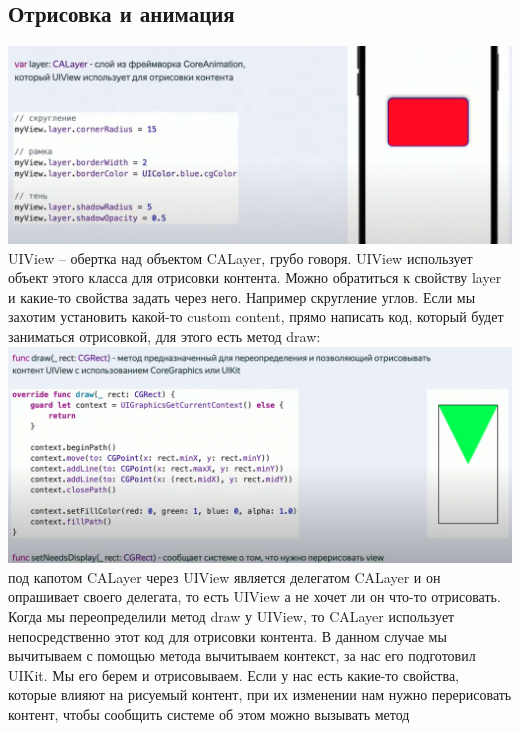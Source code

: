 \documentclass{article}
\begin{document}
    \subsection{Отрисовка и анимация}
    \includegraphics[scale = 0.3]{pic/Снимок экрана 2023-08-01 в 00.01.41.png}
    \newline
    UIView -- обертка над объектом CALayer, грубо говоря. 
    \newline
    UIView использует объект этого класса для отрисовки контента. Можно обратиться к свойству layer и какие-то свойства задать через него. Например скругление углов.
    \newline
    Если мы захотим установить какой-то custom content, прямо написать код, который будет заниматься отрисовкой, для этого есть метод draw:
    \newline
    \includegraphics[scale = 0.2]{pic/Снимок экрана 2023-08-01 в 00.04.32.png}
    \newline
    под капотом CALayer через UIView является делегатом CALayer и он опрашивает своего делегата, то есть UIView а не хочет ли он что-то отрисовать. 
    \newline
    Когда мы переопределили метод draw у UIView, то CALayer использует непосредственно этот код для отрисовки контента. 
    \newline
    В данном случае мы вычитываем с помощью метода  вычитываем контекст, за нас его подготовил UIKit. Мы его берем и отрисовываем. 
    \newline
    Если у нас есть какие-то свойства, которые влияют на рисуемый контент, при их изменении нам нужно перерисовать контент, чтобы сообщить системе об этом можно вызывать метод 
\end{document}
